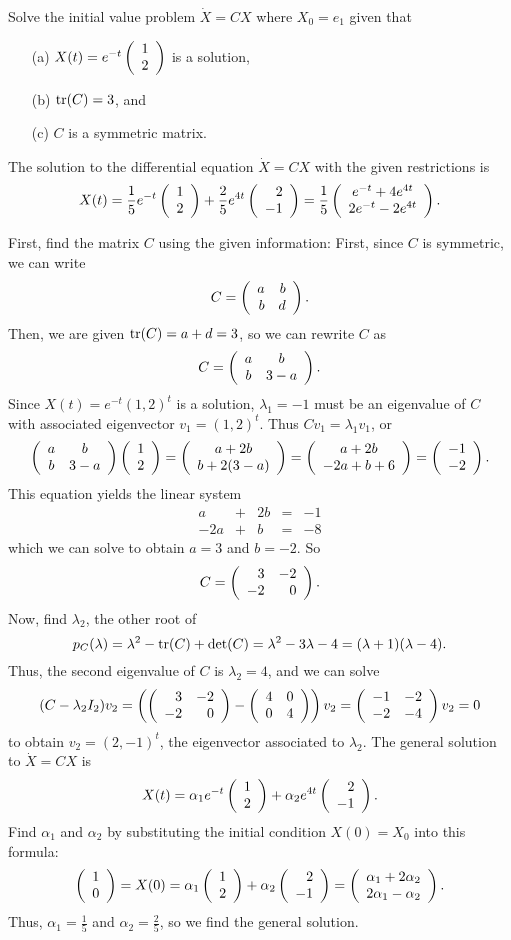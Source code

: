 \documentclass{ximera}
\begin{document}
\begin{exercise}  \label{c4.10A.2}
Solve the initial value problem $\dot{X}=CX$ where $X_0=e_1$ given that
\begin{itemize}
\item[(a)]	$X(t) = e^{-t}\left(\begin{array}{r} 1 \\ 2\end{array}\right)$ is a solution,
\item[(b)]	${\rm tr}(C)=3$, and
\item[(c)]	$C$ is a symmetric matrix.
\end{itemize}

\begin{solution}
\ans The solution to the differential equation $\dot{X} =
CX$ with the given restrictions is
\[
X(t) = \frac{1}{5}e^{-t}\left(\begin{array}{r} 1 \\ 2\end{array}\right) + \frac{2}{5}e^{4t}\left(\begin{array}{r} 2 \\ -1\end{array}\right)
= \frac{1}{5}\left(\begin{array}{c} e^{-t} + 4e^{4t} \\ 2e^{-t} - 2e^{4t}\end{array}\right).
\]

\soln First, find the matrix $C$ using the given information:
First, since $C$ is symmetric, we can write
\[
C = \left(\begin{array}{rr} a & b\\ b &d\end{array}\right).
\]
Then, we are given ${\rm tr}(C) = a + d = 3$, so we can rewrite $C$ as
\[
C = \left(\begin{array}{cc} a & b\\ b &3 - a\end{array}\right).
\]
Since $X(t) = e^{-t}(1,2)^t$ is a solution, $\lambda_1 = -1$
must be an eigenvalue of $C$ with associated eigenvector $v_1 = (1,2)^t$.
Thus $Cv_1 = \lambda_1v_1$, or
\[
\left(\begin{array}{cc} a & b\\ b &3 - a\end{array}\right)\left(\begin{array}{r} 1 \\ 2\end{array}\right) = \left(\begin{array}{c} a + 2b \\ b + 2(3 - a)\end{array}\right)
= \left(\begin{array}{c} a + 2b \\ -2a + b + 6\end{array}\right) = \left(\begin{array}{r} -1 \\ -2\end{array}\right).
\]
This equation yields the linear system
\[
\begin{array}{rrrrr}
a & + & 2b & = & -1 \\
-2a & + & b & = & -8
\end{array}
\]
which we can solve to obtain $a = 3$ and $b = -2$.  So
\[
C = \left(\begin{array}{rr} 3 & -2\\ -2 &0\end{array}\right).
\]
Now, find $\lambda_2$, the other root of
\[
p_C(\lambda) = \lambda^2 - {\rm tr}(C) + \det(C) = \lambda^2 - 3\lambda -4
= (\lambda + 1)(\lambda - 4).
\]
Thus, the second eigenvalue of $C$ is $\lambda_2 = 4$, and we can solve
\[
(C - \lambda_2I_2)v_2 = \left(\left(\begin{array}{rr} 3 & -2\\ -2 &0\end{array}\right) - \left(\begin{array}{rr} 4 & 0\\ 0 &4\end{array}\right)
\right)v_2 = \left(\begin{array}{rr} -1 & -2\\ -2 &-4\end{array}\right)v_2 = 0
\]
to obtain $v_2 = (2,-1)^t$, the eigenvector associated to $\lambda_2$.
The general solution to $\dot{X} = CX$ is
\[
X(t) = \alpha_1e^{-t}\left(\begin{array}{r} 1 \\ 2\end{array}\right) + \alpha_2e^{4t}\left(\begin{array}{r} 2 \\ -1\end{array}\right).
\]
Find $\alpha_1$ and $\alpha_2$ by substituting the initial condition $X(0)
= X_0$ into this formula:
\[
\left(\begin{array}{r} 1 \\ 0\end{array}\right) = X(0) = \alpha_1\left(\begin{array}{r} 1 \\ 2\end{array}\right) + \alpha_2\left(\begin{array}{r} 2 \\ -1\end{array}\right)
= \left(\begin{array}{c} \alpha_1 + 2\alpha_2 \\ 2\alpha_1 - \alpha_2\end{array}\right).
\]
Thus, $\alpha_1 = \frac{1}{5}$ and $\alpha_2 = \frac{2}{5}$, so we find
the general solution.


\end{solution}
\end{exercise}
\end{document}
